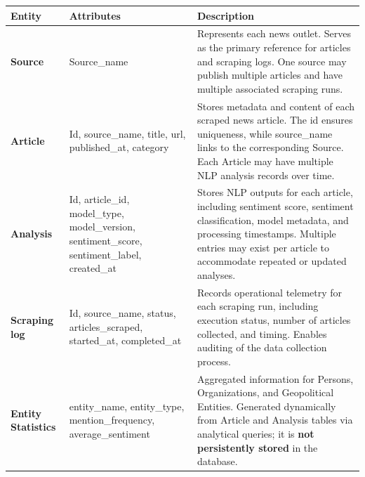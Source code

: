 {\def\LTcaptype{none} %
\begin{longtable}[]{@{}
  >{\raggedright\arraybackslash}p{}
  >{\raggedright\arraybackslash}p{}
  >{\raggedright\arraybackslash}p{}@{}}
\toprule\noalign{}
\begin{minipage}[b]{\linewidth}\raggedright
\textbf{Entity}
\end{minipage} & \begin{minipage}[b]{\linewidth}\raggedright
\textbf{Attributes}
\end{minipage} & \begin{minipage}[b]{\linewidth}\raggedright
\textbf{Description}
\end{minipage} \\
\midrule\noalign{}
\endhead
\bottomrule\noalign{}
\endlastfoot
\textbf{Source} & Source\_name & Represents each news outlet. Serves as the primary reference for articles and scraping logs. One source may publish multiple articles and have multiple associated scraping runs. \\
\textbf{Article} & Id, source\_name, title, url, published\_at, category & Stores metadata and content of each scraped news article. The id ensures uniqueness, while source\_name links to the corresponding Source. Each Article may have multiple NLP analysis records over time. \\
\textbf{Analysis} & Id, article\_id, model\_type, model\_version, sentiment\_score, sentiment\_label, created\_at & Stores NLP outputs for each article, including sentiment score, sentiment classification, model metadata, and processing timestamps. Multiple entries may exist per article to accommodate repeated or updated analyses. \\
\textbf{Scraping log} & Id, source\_name, status, articles\_scraped, started\_at, completed\_at & Records operational telemetry for each scraping run, including execution status, number of articles collected, and timing. Enables auditing of the data collection process. \\
\textbf{Entity Statistics} & entity\_name, entity\_type, mention\_frequency, average\_sentiment & Aggregated information for Persons, Organizations, and Geopolitical Entities. Generated dynamically from Article and Analysis tables via analytical queries; it is \textbf{not persistently stored} in the database. \\
\end{longtable}
}

